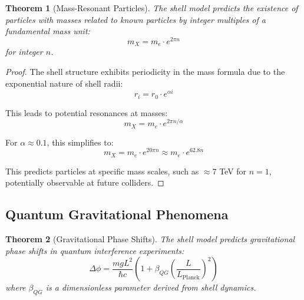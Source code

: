 \documentclass[12pt,a4paper]{article}
\newtheorem{theorem}{Theorem}[section]
\begin{document}
\begin{theorem}[Mass-Resonant Particles]
\label{thm:mass-resonant}
The shell model predicts the existence of particles with masses related to known particles by integer multiples of a fundamental mass unit:
\begin{equation}
m_X = m_e \cdot e^{2\pi n}
\end{equation}
for integer $n$.
\end{theorem}

\begin{proof}
The shell structure exhibits periodicity in the mass formula due to the exponential nature of shell radii:
\begin{equation}
r_i = r_0 \cdot e^{\alpha i}
\end{equation}

This leads to potential resonances at masses:
\begin{equation}
m_X = m_e \cdot e^{2\pi n/\alpha}
\end{equation}

For $\alpha \approx 0.1$, this simplifies to:
\begin{equation}
m_X = m_e \cdot e^{20\pi n} \approx m_e \cdot e^{62.8 n}
\end{equation}

This predicts particles at specific mass scales, such as $\approx 7$ TeV for $n = 1$, potentially observable at future colliders.
\end{proof}

\subsection{Quantum Gravitational Phenomena}
\label{subsec:quantum-gravity}

\begin{theorem}[Gravitational Phase Shifts]
\label{thm:gravitational-phase}
The shell model predicts gravitational phase shifts in quantum interference experiments:
\begin{equation}
\Delta\phi = \frac{m g L^2}{\hbar c} \left(1 + \beta_{QG} \left(\frac{L}{L_{\text{Planck}}}\right)^2\right)
\end{equation}
where $\beta_{QG}$ is a dimensionless parameter derived from shell dynamics.
\end{theorem}
\end{document}
